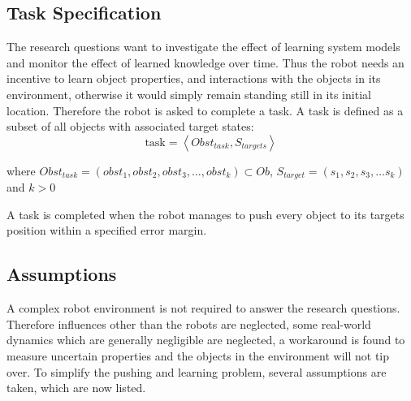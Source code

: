 \subsection{Task Specification}%
\label{subsec:task}
The research questions want to investigate the effect of learning system models and monitor the effect of learned knowledge over time. Thus the robot needs an incentive to learn object properties, and interactions with the objects in its environment, otherwise it would simply remain standing still in its initial location. Therefore the robot is asked to complete a task. A task is defined as a subset of all objects with associated target states:\bs
\[\text{task} = \left\langle Obst_{task}, S_{targets} \right\rangle\]

where $Obst_{task} = (obst_1, obst_2, obst_3, \dots, obst_k) \subset Ob$, $S_{target} = (s_1, s_2, s_3, \dots s_k)$ and $k>0$\bs



A task is completed when the robot manages to push every object to its targets position within a specified error margin.

\subsection{Assumptions}%
\label{subsec:assumptions}
A complex robot environment is not required to answer the research questions. Therefore influences other than the robots are neglected, some real-world dynamics which are generally negligible are neglected, a workaround is found to measure uncertain properties and the objects in the environment will not tip over. To simplify the pushing and learning problem, several assumptions are taken, which are now listed.\bs
{}

